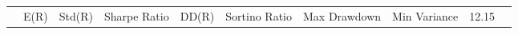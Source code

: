 \begin{tabular}{lrrrrrrrrr}
 & E(R) & Std(R) & Sharpe Ratio & DD(R) & Sortino Ratio & Max Drawdown & %
Min Variance & 12.15%
\end{tabular}
